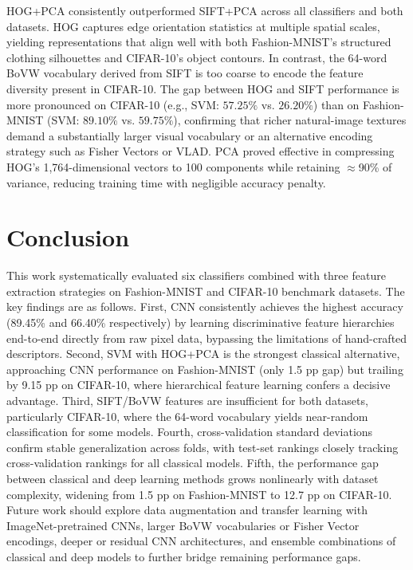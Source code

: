 \documentclass[conference]{IEEEtran}
\begin{document}
HOG+PCA consistently outperformed SIFT+PCA across all classifiers and both datasets. HOG captures edge orientation statistics at multiple spatial scales, yielding representations that align well with both Fashion-MNIST's structured clothing silhouettes and CIFAR-10's object contours. In contrast, the 64-word BoVW vocabulary derived from SIFT is too coarse to encode the feature diversity present in CIFAR-10. The gap between HOG and SIFT performance is more pronounced on CIFAR-10 (e.g., SVM: $57.25\%$ vs. $26.20\%$) than on Fashion-MNIST (SVM: $89.10\%$ vs. $59.75\%$), confirming that richer natural-image textures demand a substantially larger visual vocabulary or an alternative encoding strategy such as Fisher Vectors or VLAD. PCA proved effective in compressing HOG's 1,764-dimensional vectors to 100 components while retaining $\approx$90\% of variance, reducing training time with negligible accuracy penalty.

\section{Conclusion}

This work systematically evaluated six classifiers combined with three feature extraction strategies on Fashion-MNIST and CIFAR-10 benchmark datasets. The key findings are as follows. First, CNN consistently achieves the highest accuracy (89.45\% and 66.40\% respectively) by learning discriminative feature hierarchies end-to-end directly from raw pixel data, bypassing the limitations of hand-crafted descriptors. Second, SVM with HOG+PCA is the strongest classical alternative, approaching CNN performance on Fashion-MNIST (only 1.5 pp gap) but trailing by 9.15 pp on CIFAR-10, where hierarchical feature learning confers a decisive advantage. Third, SIFT/BoVW features are insufficient for both datasets, particularly CIFAR-10, where the 64-word vocabulary yields near-random classification for some models. Fourth, cross-validation standard deviations confirm stable generalization across folds, with test-set rankings closely tracking cross-validation rankings for all classical models. Fifth, the performance gap between classical and deep learning methods grows nonlinearly with dataset complexity, widening from 1.5 pp on Fashion-MNIST to 12.7 pp on CIFAR-10. Future work should explore data augmentation and transfer learning with ImageNet-pretrained CNNs, larger BoVW vocabularies or Fisher Vector encodings, deeper or residual CNN architectures, and ensemble combinations of classical and deep models to further bridge remaining performance gaps.
\end{document}
